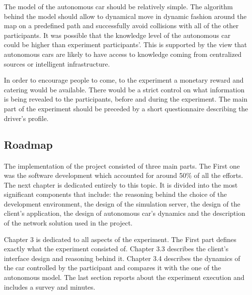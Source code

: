\documentclass[11pt,english,twoside]{article}
\begin{document}
\par
The model of the autonomous car should be relatively simple. The algorithm behind the model should allow to dynamical move in dynamic fashion around the map on a predefined path and successfully avoid collisions with all of the other participants. It was possible that the knowledge level of the autonomous car could be higher than experiment participants'. This is supported by the view that autonomous cars are likely to have access to knowledge coming from centralized sources or intelligent infrastructure.

\par
In order to encourage people to come, to the experiment a monetary reward and catering would be available. There would be a strict control on what information is being revealed to the participants, before and during the experiment. The main part of the experiment should be preceded by a short questionnaire describing the driver's profile.

\par









\subsection{Roadmap}

\paragraph{}

The implementation of the project consisted of three main parts. The First one was the software development which accounted for around 50\% of all the efforts. The next chapter is dedicated entirely to this topic. It is divided into the most significant components that include: the reasoning behind the choice of the development environment, the design of the simulation server, the design of the client's application, the design of autonomous car's dynamics and the description of the network solution used in the project. 

\par

Chapter 3 is dedicated to all aspects of the experiment. The First part defines exactly what the experiment consisted of. Chapter 3.3 describes the client's interface design and reasoning behind it. Chapter 3.4 describes the dynamics of the car controlled by the participant and compares it with the one of the autonomous model. The last section reports about the experiment execution and includes a survey and minutes.
\end{document}
